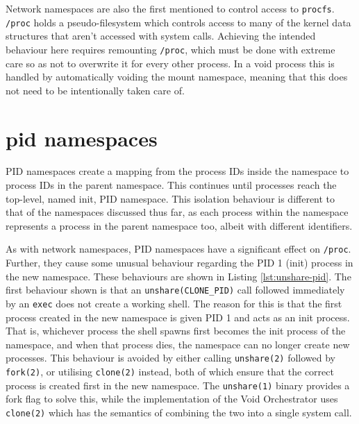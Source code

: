 \documentclass[12pt,a4paper,twoside]{report}
\begin{document}
Network namespaces are also the first mentioned to control access to \texttt{procfs}. \texttt{/proc} holds a pseudo-filesystem which controls access to many of the kernel data structures that aren't accessed with system calls. Achieving the intended behaviour here requires remounting \texttt{/proc}, which must be done with extreme care so as not to overwrite it for every other process. In a void process this is handled by automatically voiding the mount namespace, meaning that this does not need to be intentionally taken care of.


\section{pid namespaces}
\label{sec:voiding-pid}

PID namespaces create a mapping from the process IDs inside the namespace to process IDs in the parent namespace. This continues until processes reach the top-level, named init, PID namespace. This isolation behaviour is different to that of the namespaces discussed thus far, as each process within the namespace represents a process in the parent namespace too, albeit with different identifiers.

As with network namespaces, PID namespaces have a significant effect on \texttt{/proc}. Further, they cause some unusual behaviour regarding the PID 1 (init) process in the new namespace. These behaviours are shown in Listing \ref{lst:unshare-pid}. The first behaviour shown is that an \texttt{unshare(CLONE\_PID)} call followed immediately by an \texttt{exec} does not create a working shell. The reason for this is that the first process created in the new namespace is given PID 1 and acts as an init process. That is, whichever process the shell spawns first becomes the init process of the namespace, and when that process dies, the namespace can no longer create new processes. This behaviour is avoided by either calling \texttt{unshare(2)} followed by \texttt{fork(2)}, or utilising \texttt{clone(2)} instead, both of which ensure that the correct process is created first in the new namespace. The \texttt{unshare(1)} binary provides a fork flag to solve this, while the implementation of the Void Orchestrator uses \texttt{clone(2)} which has the semantics of combining the two into a single system call.
\end{document}
